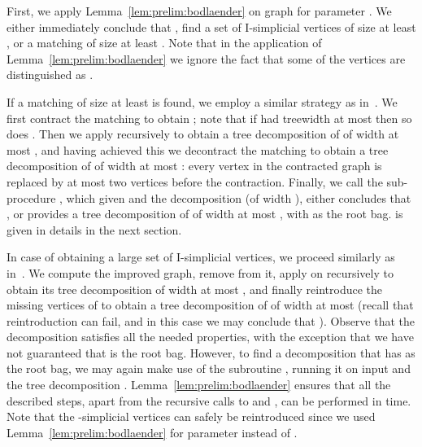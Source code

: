 \documentclass[a4paper,11pt]{article}
\theoremstyle{definition}
\theoremstyle{remark}
\begin{document}
First, we apply Lemma~\ref{lem:prelim:bodlaender} on graph  for
parameter .  We either immediately conclude that ,
find a set of I-simplicial vertices of size at least
, or a matching of size at least .
Note that in the application of Lemma~\ref{lem:prelim:bodlaender} we
ignore the fact that some of the vertices are distinguished as .

If a matching  of size at least  is found, we
employ a similar strategy as in~\cite{Bodlaender96}.  We first
contract the matching  to obtain ; note that if  had
treewidth at most  then so does .  Then we apply 
recursively to obtain a tree decomposition  of  of width at
most , and having achieved this we decontract the matching 
to obtain a tree decomposition  of  of width at most :
every vertex in the contracted graph is replaced by at most two
vertices before the contraction.  Finally, we call the sub-procedure
, which given  and the decomposition  (of
width ), either concludes that , or provides a tree
decomposition of  of width at most , with  as the root
bag.   is given in details in the next section.

In case of obtaining a large set  of I-simplicial vertices, we
proceed similarly as in~\cite{Bodlaender96}.  We compute the improved
graph, remove  from it, apply  on 
recursively to obtain its tree decomposition  of width at most
, and finally reintroduce the missing vertices of  to obtain
a tree decomposition  of  of width at most  (recall that
reintroduction can fail, and in this case we may conclude that
).  Observe that the decomposition  satisfies all the
needed properties, with the exception that we have not guaranteed that
 is the root bag.  However, to find a decomposition that has
 as the root bag, we may again make use of the subroutine
, running it on input  and the tree
decomposition .  Lemma~\ref{lem:prelim:bodlaender} ensures that
all the described steps, apart from the recursive calls to 
and , can be performed in  time.
Note that the -simplicial vertices can safely be reintroduced since
we used Lemma~\ref{lem:prelim:bodlaender} for parameter  instead
of .
\end{document}
